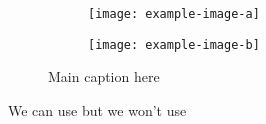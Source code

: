 \documentclass{article}
\begin{document}
\begin{figure}
    \centering
    \begin{subfigure}[t]{0.47\textwidth} %
        \texttt{[image: example-image-a]}
        \label{fig:imga}
    \end{subfigure}
    \begin{subfigure}[t]{0\textwidth} %
         \texttt{[image: example-image-b]}
         \label{fig:imgb}   
    \end{subfigure}
\caption{Main caption here}
\label{fig:main}
\end{figure}

We can use  but we won't use 
\end{document}
